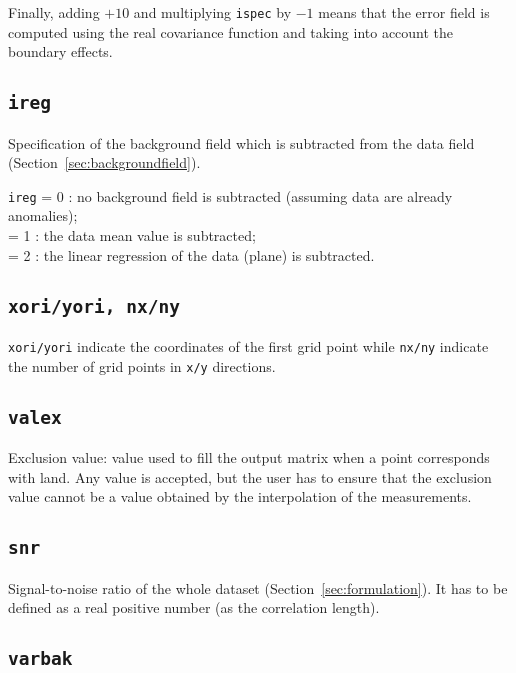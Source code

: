 Finally, adding $+10$ and multiplying \texttt{ispec} by $-1$ means that the error field is computed using the real covariance function and taking into account the boundary effects. 

\subsection{\texttt{ireg}}

Specification of the background field which is subtracted from the data field (Section~\ref{sec:backgroundfield}).

\texttt{ireg}             = 0 \qquad: no background field is subtracted (assuming data are already anomalies); \\
  = 1 \qquad: the data mean value is subtracted;\\
  = 2 \qquad: the linear regression of the data (plane) is subtracted.

\subsection{\texttt{xori/yori, nx/ny}}

\texttt{xori/yori} indicate the coordinates of the first grid point while \texttt{nx/ny} indicate the number of grid points in \texttt{x/y} directions.



\subsection{\texttt{valex}}

Exclusion value: value used to fill the output matrix when a point corresponds with land. Any value is accepted, but the user has to ensure that the exclusion value cannot be a value obtained by the interpolation of the measurements. 


\subsection{\texttt{snr}}

Signal-to-noise ratio of the whole dataset (Section~\ref{sec:formulation}). It has to be defined as a real positive number (as the correlation length).

\subsection{\texttt{varbak}}

